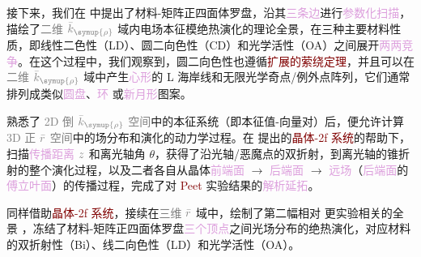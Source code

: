 接下来，我们在  中提出了\textcolor{NavyBlue}{材料-矩阵正四面体罗盘}，沿其\textcolor{Plum}{三条边}进行\textcolor{Plum}{参数化扫描}，描绘了\textcolor{gray}{二维} $\mathcolor{gray}{\bar{k}_{\symup{\rho}}}$ 域内电场\textcolor{PineGreen}{本征模}\textcolor{NavyBlue}{绝热演化}的\textcolor{NavyBlue}{理论全景}，在三种主要材料性质，即\textcolor{NavyBlue}{线性二色性（LD）}、\textcolor{NavyBlue}{圆二向色性（CD）}和\textcolor{NavyBlue}{光学活性（OA）}之间展开\textcolor{Plum}{两两竞争}。在这个过程中，我们观察到，\textcolor{NavyBlue}{圆二向色性}也遵循\textcolor{Maroon}{扩展的萦绕定理}\cite{berryOpticalSingularitiesBirefringent2003}，并且可以在\textcolor{gray}{二维} $\mathcolor{gray}{\bar{k}_{\symup{\rho}}}$ 域中产生\textcolor{Plum}{心形}的 \textcolor{PineGreen}{L 海岸线}和无限\textcolor{PineGreen}{光学奇点}/\textcolor{PineGreen}{例外点}阵列，它们通常排列成类似\textcolor{Plum}{圆盘}、\textcolor{Plum}{环}\cite{kirillovUnfoldingEigenvalueSurfaces2005} 或\textcolor{Plum}{新月形}图案。

熟悉了 \textcolor{gray}{2D 倒} $\mathcolor{gray}{\bar{k}_{\symup{\rho}}}$ \textcolor{gray}{空间}中的\textcolor{PineGreen}{本征系统}（即\textcolor{PineGreen}{本征值-向量对}）后，便允许计算 \textcolor{gray}{3D 正} $\mathcolor{gray}{\bar{r}}$ \textcolor{gray}{空间}中的\textcolor{NavyBlue}{场分布和演化}的动力学过程。在  提出的\textcolor{Maroon}{晶体-2f 系统}的帮助下，扫描\textcolor{Plum}{传播距离} $\mathcolor{gray}{z}$ 和离\textcolor{PineGreen}{光轴}角 $\theta$，获得了沿\textcolor{PineGreen}{光轴}/\textcolor{PineGreen}{恶魔点}的\textcolor{PineGreen}{双折射}，到离\textcolor{PineGreen}{光轴}的\textcolor{PineGreen}{锥折射}的整个\textcolor{NavyBlue}{演化}过程，以及二者各自从晶体\textcolor{Plum}{前端面} $\longrightarrow$ \textcolor{Plum}{后端面} $\longrightarrow$ \textcolor{Plum}{远场}（\textcolor{Plum}{后端面}的\textcolor{Plum}{傅立叶面}）的\textcolor{NavyBlue}{传播过程}，完成了对 \textcolor{Maroon}{Peet} 实验结果的\textcolor{Plum}{解析延拓}。

同样借助\textcolor{Maroon}{晶体-2f 系统}，接续在\textcolor{gray}{三维} $\mathcolor{gray}{\bar{r}}$ 域中，绘制了第二幅相对  更\textcolor{NavyBlue}{实验相关}的全景 ，冻结了\textcolor{NavyBlue}{材料-矩阵正四面体罗盘}\textcolor{Plum}{三个顶点}之间光场分布的\textcolor{NavyBlue}{绝热演化}，对应材料的\textcolor{NavyBlue}{双折射性（Bi）}、\textcolor{NavyBlue}{线二向色性（LD）}和\textcolor{NavyBlue}{光学活性（OA）}。


